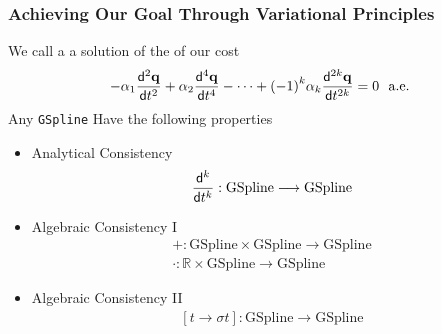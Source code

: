 \begin{frame}[t]
	\frametitle{Achieving Our Goal Through Variational Principles}
	{\fontsize{9}{5}
		We call a  a solution of the  of our cost
		\begin{equation*}
			-\alpha_1 \diffk{\qv}{t}{2}+ \alpha_2 \diffk{\qv}{t}{4}- \cdots +  {(-1)}^k \alpha_k \diffk{\qv}{t}{2k}= 0 \ \ \text{a.e.}
		\end{equation*}
		Any \texttt{GSpline} Have the following properties
		\begin{itemize}
			\item Analytical Consistency
			      \begin{equation*}
				      \frac{\mathsf{d}^{k} }{\mathsf{d} t^{k}}:\text{GSpline}\longrightarrow \text{GSpline}
			      \end{equation*}
			\item Algebraic Consistency I
			      \begin{eqnarray*}
				      +:\text{GSpline}\times\text{GSpline}\longrightarrow \text{GSpline}\\
				      \cdot:\mathbb{R} \times \text{GSpline}\longrightarrow \text{GSpline}
			      \end{eqnarray*}
			\item Algebraic Consistency II
			      \begin{eqnarray*}
				      \left[t \rightarrow \sigma t \right]:\text{GSpline}\longrightarrow \text{GSpline}
			      \end{eqnarray*}
		\end{itemize}
	}
\end{frame}
